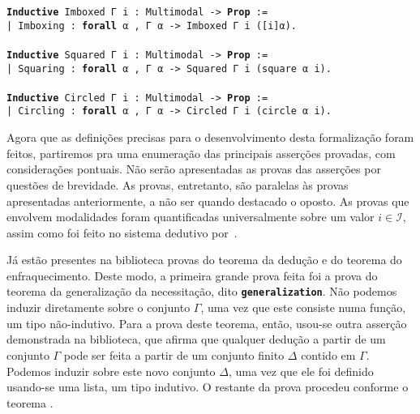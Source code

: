 \vspace{0.5\baselineskip}
\begin{tcolorbox}[enhanced jigsaw, breakable, sharp corners, colframe=black, colback=white, boxrule=0.5pt, left=1.5mm, right=1.5mm, top=1.5mm, bottom=1.5mm]
\noindent
\texttt
{\noindent\footnotesize\textbf{Inductive} Imboxed Γ i : Multimodal -> \textbf{Prop} :=\\
| Imboxing : \textbf{forall} α , Γ α  -> Imboxed Γ i ([i]α).
\\
\\
\textbf{Inductive} Squared Γ i : Multimodal -> \textbf{Prop} :=\\
| Squaring : \textbf{forall} α , Γ α  -> Squared Γ i (square α i).
\\
\\
\textbf{Inductive} Circled Γ i : Multimodal -> \textbf{Prop} :=\\
| Circling : \textbf{forall} α , Γ α  -> Circled Γ i (circle α i).
}
\end{tcolorbox}

\vspace{0.5\baselineskip}
Agora que as definições precisas para o desenvolvimento desta formalização foram feitos, partiremos pra uma enumeração das principais asserções provadas, com considerações pontuais.
Não serão apresentadas as provas das asserções por questões de brevidade.
As provas, entretanto, são paralelas às provas apresentadas anteriormente, a não ser quando destacado o oposto.
As provas que envolvem modalidades foram quantificadas universalmente sobre um valor $i\in\mathcal{I}$, assim como foi feito no sistema dedutivo por~\cite{Nunes}.

\vspace{0.5\baselineskip}
Já estão presentes na biblioteca provas do teorema da dedução e do teorema do enfraquecimento.
Deste modo, a primeira grande prova feita foi a prova do teorema da generalização da necessitação, dito \texttt{\footnotesize\textbf{generalization}}.
Não podemos induzir diretamente sobre o conjunto $\Gamma$, uma vez que este consiste numa função, um tipo não-indutivo.
Para a prova deste teorema, então, usou-se outra asserção demonstrada na biblioteca, que afirma que qualquer dedução a partir de um conjunto $\Gamma$ pode ser feita a partir de um conjunto finito $\Delta$ contido em $\Gamma$.
Podemos induzir sobre este novo conjunto $\Delta$, uma vez que ele foi definido usando-se uma lista, um tipo indutivo.
O restante da prova procedeu conforme o teorema .

